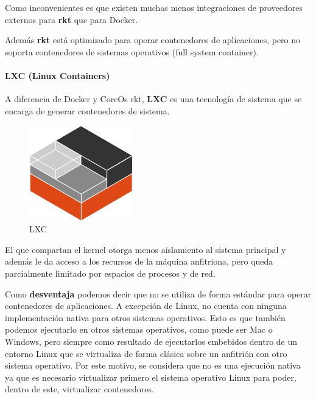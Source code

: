 Como inconvenientes es que existen muchas menos integraciones de proveedores externos para \textbf{rkt} que para Docker.

Además \textbf{rkt} está optimizado para operar contenedores de aplicaciones, pero no soporta contenedores de sistemas operativos (full system container).
\paragraph{LXC (Linux Containers)}
A diferencia de Docker y CoreOs rkt, \textbf{LXC} es una tecnología de sistema que se encarga de generar contenedores de sistema.\cite{lxc} 

\begin{figure}[H]
	\centering
\includegraphics[width=0.4\textwidth]{imagenes/entorno/lxc.png}
	\caption{LXC} \label{lxc}
\end{figure}

El que compartan el kernel otorga menos aislamiento al sistema principal y además le da acceso a los recursos de la máquina anfitriona, pero queda parcialmente limitado por espacios de procesos y de red.

Como \textbf{desventaja} podemos decir que no se utiliza de forma estándar para operar contenedores de aplicaciones. A excepción de Linux, no cuenta con ninguna implementación nativa para otros sistemas operativos. Esto es que también podemos ejecutarlo en otros sistemas operativos, como puede ser Mac o Windows, pero siempre como resultado de ejecutarlos embebidos dentro de un entorno Linux que se virtualiza de forma clásica sobre un anfitrión con otro sistema operativo. 
\newpage
Por este motivo, se considera que no es una ejecución nativa ya que es necesario virtualizar primero el sistema operativo Linux para poder, dentro de este, virtualizar contenedores.
